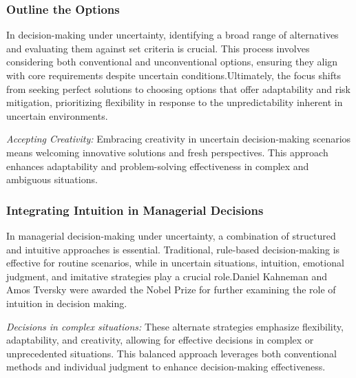 \documentclass{article}
\begin{document}
\subsubsection{Outline the Options}
In decision-making under uncertainty, identifying a broad range of alternatives and evaluating them against set criteria is crucial. This process involves considering both conventional and unconventional options, ensuring they align with core requirements despite uncertain conditions.\cite{fulop2005introduction}Ultimately, the focus shifts from seeking perfect solutions to choosing options that offer adaptability and risk mitigation, prioritizing flexibility in response to the unpredictability inherent in uncertain environments.

\textit{Accepting Creativity:} Embracing creativity in uncertain decision-making scenarios means welcoming innovative solutions and fresh perspectives. This approach enhances adaptability and problem-solving effectiveness in complex and ambiguous situations.

\subsubsection{Integrating Intuition in Managerial Decisions}
In managerial decision-making under uncertainty, a combination of structured and intuitive approaches is essential. Traditional, rule-based decision-making is effective for routine scenarios, while in uncertain situations, intuition, emotional judgment, and imitative strategies play a crucial role.Daniel Kahneman and Amos Tversky were awarded the Nobel Prize for further examining the role of intuition in decision making.

\textit{Decisions in complex situations:} These alternate strategies emphasize flexibility, adaptability, and creativity, allowing for effective decisions in complex or unprecedented situations. This balanced approach leverages both conventional methods and individual judgment to enhance decision-making effectiveness.\cite{rachel2011common}
\end{document}
